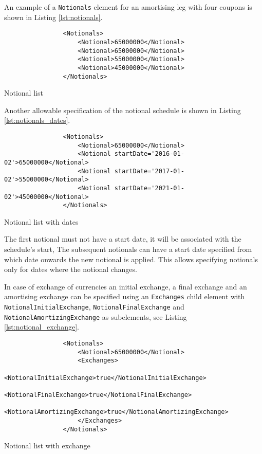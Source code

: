 \begin{itemize}
\vspace{1em}

An example of a \lstinline!Notionals! element for an amortising leg with four coupons is shown in Listing \ref{lst:notionals}.
\begin{listing}[H]
\begin{verbatim}
                <Notionals>
                    <Notional>65000000</Notional>
                    <Notional>65000000</Notional>
                    <Notional>55000000</Notional>
                    <Notional>45000000</Notional>
                </Notionals>
\end{verbatim}
\caption{Notional list}
\label{lst:notionals}
\end{listing}

Another allowable specification of the notional schedule is shown in Listing \ref{lst:notionals_dates}. 
\begin{listing}[H]
\begin{verbatim}
                <Notionals>
                    <Notional>65000000</Notional>
                    <Notional startDate='2016-01-02'>65000000</Notional>
                    <Notional startDate='2017-01-02'>55000000</Notional>
                    <Notional startDate='2021-01-02'>45000000</Notional>
                </Notionals>
\end{verbatim}
\caption{Notional list with dates}
\label{lst:notionals_dates}
\end{listing}
The first notional must not have a start date, it will be associated
with the schedule's start, The subsequent notionals can have a start
date specified from which date onwards the new notional is applied. This allows
specifying notionals only for dates where the notional changes. 

\vspace{1em} 

In case of exchange of currencies an initial exchange, a final exchange
and an amortising exchange can be specified using an \lstinline!Exchanges! child element with \break
\lstinline!NotionalInitialExchange!, \lstinline!NotionalFinalExchange! and \break
\lstinline!NotionalAmortizingExchange! as subelements, see Listing
\ref{lst:notional_exchange}.

\begin{listing}[H]
\begin{verbatim}
                <Notionals>
                    <Notional>65000000</Notional>
                    <Exchanges>
                      <NotionalInitialExchange>true</NotionalInitialExchange>
                      <NotionalFinalExchange>true</NotionalFinalExchange>
                      <NotionalAmortizingExchange>true</NotionalAmortizingExchange>
                    </Exchanges>
                </Notionals>
\end{verbatim}
\caption{Notional list with exchange}
\label{lst:notional_exchange}
\end{listing}


\end{itemize}
